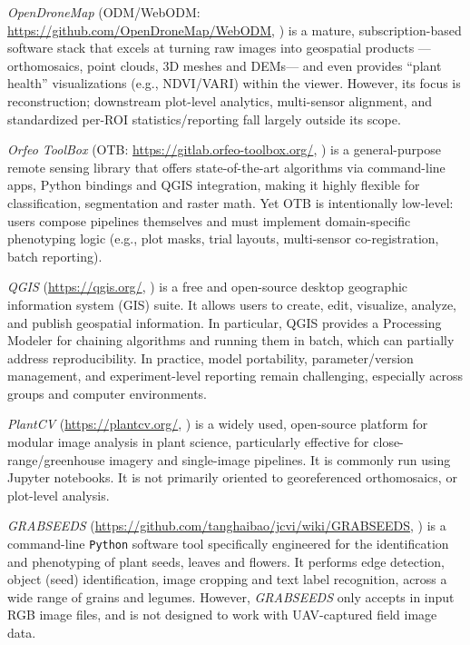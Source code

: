 \documentclass[drones,technicalnote,accept,pdftex,moreauthors]{Definitions/mdpi}
\begin{document}
\textit{OpenDroneMap} (ODM/WebODM: \url{https://github.com/OpenDroneMap/WebODM}, \cite{vacca2020web}) is a mature, subscription-based software stack that excels at turning raw images into geospatial products —orthomosaics, point clouds, 3D meshes and DEMs— and even provides “plant health” visualizations (e.g., NDVI/VARI) within the viewer. However, its focus is reconstruction; downstream plot-level analytics, multi-sensor alignment, and standardized per-ROI statistics/reporting fall largely outside its scope.

\textit{Orfeo ToolBox} (OTB: \url{https://gitlab.orfeo-toolbox.org/}, \cite{noauthor_orfeo_nodate, grizonnet_orfeo_2017}) is a general-purpose remote sensing library that offers state-of-the-art algorithms via command-line apps, Python bindings and QGIS integration, making it highly flexible for classification, segmentation and raster math. Yet OTB is intentionally low-level: users compose pipelines themselves and must implement domain-specific phenotyping logic (e.g., plot masks, trial layouts, multi-sensor co-registration, batch reporting). 

\textit{QGIS} (\url{https://qgis.org/}, \cite{moyroud2018introduction}) is a free and open-source desktop geographic information system (GIS) suite. It allows users to create, edit, visualize, analyze, and publish geospatial information. In particular, QGIS provides a Processing Modeler \cite{dobesova2020evaluation} for chaining algorithms and running them in batch, which can partially address reproducibility. In practice, model portability, parameter/version management, and experiment-level reporting remain challenging, especially across groups and computer environments.

\textit{PlantCV} (\url{https://plantcv.org/}, \cite{noauthor_plantcv_2021}) is a widely used, open-source platform for modular image analysis in plant science, particularly effective for close-range/greenhouse imagery and single-image pipelines. It is commonly run using Jupyter notebooks. It is not primarily oriented to georeferenced orthomosaics,  or plot-level analysis.

\textit{GRABSEEDS} (\url{https://github.com/tanghaibao/jcvi/wiki/GRABSEEDS}, \cite{tang2024grabseeds}) is a command-line \texttt{Python} software tool specifically engineered for the identification and phenotyping of plant seeds, leaves and flowers.
It performs edge detection, object (seed) identification, image cropping and text label recognition, across a wide range of grains and legumes.
However, \textit{GRABSEEDS} only accepts in input RGB image files, and is not designed to work with UAV-captured field image data.
\end{document}
